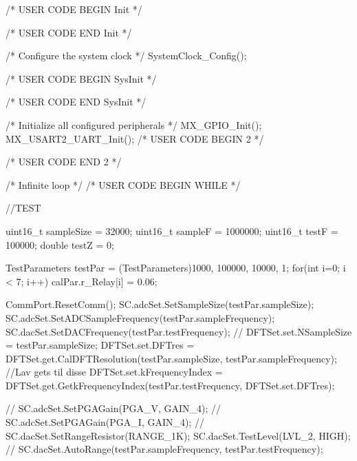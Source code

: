 {  /* USER CODE BEGIN Init */

  /* USER CODE END Init */

  /* Configure the system clock */
  SystemClock_Config();

  /* USER CODE BEGIN SysInit */

  /* USER CODE END SysInit */

  /* Initialize all configured peripherals */
  MX_GPIO_Init();
  MX_USART2_UART_Init();
  /* USER CODE BEGIN 2 */

  /* USER CODE END 2 */

  /* Infinite loop */
  /* USER CODE BEGIN WHILE */

  //TEST

  uint16_t sampleSize = 32000;
  uint16_t sampleF = 1000000;
  uint16_t testF = 100000;
  double testZ = 0;

  TestParameters testPar = (TestParameters){1000, 100000, 10000, 1};
  for(int i=0; i < 7; i++) {
	  calPar.r_Relay[i] = 0.06;
  }


  CommPort.ResetComm();
  SC.adcSet.SetSampleSize(testPar.sampleSize);
  SC.adcSet.SetADCSampleFrequency(testPar.sampleFrequency);
  SC.dacSet.SetDACFrequency(testPar.testFrequency);
  //
  DFTSet.set.NSampleSize = testPar.sampleSize;
  DFTSet.set.DFTres = DFTSet.get.CalDFTResolution(testPar.sampleSize, testPar.sampleFrequency); //Lav gets til disse
  DFTSet.set.kFrequencyIndex = DFTSet.get.GetkFrequencyIndex(testPar.testFrequency, DFTSet.set.DFTres);

//  SC.adcSet.SetPGAGain(PGA_V, GAIN_4);
//  SC.adcSet.SetPGAGain(PGA_I, GAIN_4);
//  SC.dacSet.SetRangeResistor(RANGE_1K);
  SC.dacSet.TestLevel(LVL_2, HIGH);
//  SC.dacSet.AutoRange(testPar.sampleFrequency, testPar.testFrequency);

}
